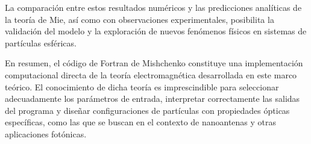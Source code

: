 \documentclass[12pt,a4paper]{article}
\begin{document}
La comparación entre estos resultados numéricos y las predicciones analíticas de la teoría de Mie, así como con observaciones experimentales, posibilita la validación del modelo
y la exploración de nuevos fenómenos físicos en sistemas de partículas esféricas.

En resumen, el código de Fortran de Mishchenko constituye una implementación computacional directa de la teoría electromagnética desarrollada en este marco teórico.
El conocimiento de dicha teoría es imprescindible para seleccionar adecuadamente los parámetros de entrada, interpretar correctamente las salidas del programa
y diseñar configuraciones de partículas con propiedades ópticas específicas, como las que se buscan en el contexto de nanoantenas y otras aplicaciones fotónicas.
\end{document}
